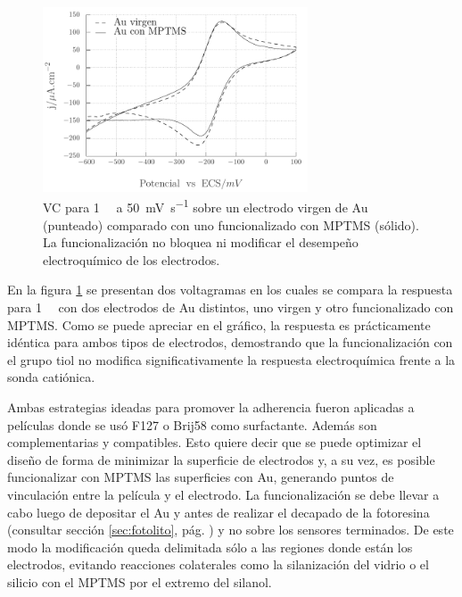 				\begin{figure}[!ht]
							\begin{center}
							\includegraphics[width=0.70\textwidth]{Graficos/Comparacion_Au-MPTMS.pdf}
							\caption[Comparación de electrodos con y sin MPTMS]{VC para \aminorutenio\space \SI{1}{\milli\Molar} a \SI{50}{\milli\volt\per\second} sobre un electrodo virgen de Au (punteado) comparado con uno funcionalizado con MPTMS (sólido). La funcionalización no bloquea ni modificar el desempeño electroquímico de los electrodos.}
							\label{fig:comparaciones_MPTMS-A}
							\end{center}
 							\end{figure}

			 En la figura \ref{fig:comparaciones_MPTMS-A} se presentan dos voltagramas en los cuales se compara la respuesta para \aminorutenio\space \SI{1}{\milli\Molar} con dos electrodos de Au distintos, uno virgen y otro funcionalizado con MPTMS. Como se puede apreciar en el gráfico, la respuesta es prácticamente idéntica para ambos tipos de electrodos, demostrando que la funcionalización con el grupo tiol no modifica significativamente la respuesta electroquímica frente a la sonda catiónica.
        		
			 Ambas estrategias ideadas para promover la adherencia fueron aplicadas a películas donde se usó F127 o Brij58 como surfactante. Además son complementarias y compatibles. Esto quiere decir que se puede optimizar el diseño de forma de minimizar la superficie de electrodos y, a su vez, es posible funcionalizar con MPTMS las superficies con Au, generando puntos de vinculación entre la película y el electrodo. La funcionalización se debe llevar a cabo luego de depositar el Au y antes de realizar el decapado de la fotoresina (consultar sección \ref{sec:fotolito}, pág. \pageref{sec:fotolito}) y no sobre los sensores terminados. De este modo la modificación queda delimitada sólo a las regiones donde están los electrodos, evitando reacciones colaterales como la silanización del vidrio o el silicio con el MPTMS por el extremo del silanol.

